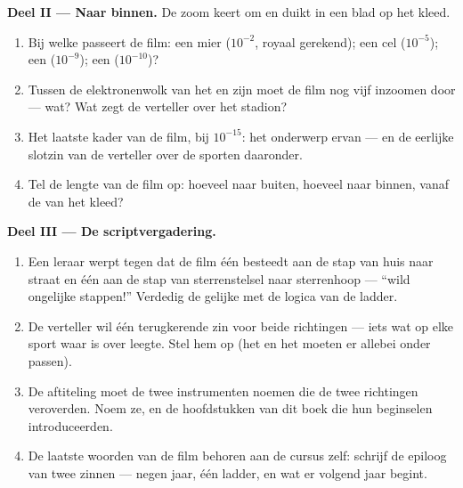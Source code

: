 \begin{problem}
\medskip\noindent\textbf{Deel II --- Naar binnen.}
De zoom keert om en duikt in een blad op het kleed.
\begin{enumerate}[resume]
  \item Bij welke  passeert de film: een mier ($10^{-2}$,
        royaal gerekend); een cel ($10^{-5}$); een
         ($10^{-9}$); een  ($10^{-10}$)?
  \item Tussen de elektronenwolk van het  en zijn
         moet de film nog vijf  inzoomen door ---
        wat? Wat zegt de verteller over het stadion?
  \item Het laatste kader van de film, bij $10^{-15}$: het onderwerp
        ervan --- en de eerlijke slotzin van de verteller over de
        sporten daaronder.
  \item Tel de lengte van de film op: hoeveel  naar buiten,
        hoeveel naar binnen, vanaf de  van het kleed?
\end{enumerate}

\medskip\noindent\textbf{Deel III --- De scriptvergadering.}
\begin{enumerate}[resume]
  \item Een leraar werpt tegen dat de film één  besteedt aan de
        stap van huis naar straat en één  aan de stap van
        sterrenstelsel naar sterrenhoop --- ``wild ongelijke stappen!''
        Verdedig de gelijke  met de logica van de ladder.
  \item De verteller wil één terugkerende zin voor beide richtingen
        --- iets wat op elke sport waar is over leegte. Stel hem op
        (het  en het  moeten er
        allebei onder passen).
  \item De aftiteling moet de twee instrumenten noemen die de twee
        richtingen veroverden. Noem ze, en de hoofdstukken van dit boek
        die hun beginselen introduceerden.
  \item De laatste woorden van de film behoren aan de cursus zelf:
        schrijf de epiloog van twee zinnen --- negen jaar, één ladder,
        en wat er volgend jaar begint.
\end{enumerate}
\end{problem}
